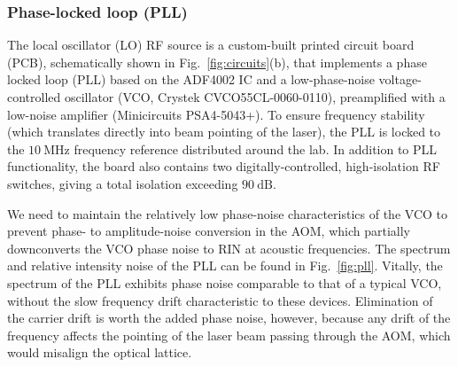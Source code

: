 \documentclass[twocolumn,aps,pra,showpacs,preprintnumbers,bibnotes]{revtex4-1}
\newcommand\unit[2]{\ensuremath{#1~\mathrm{{#2}}}}
\begin{document}
\subsubsection{Phase-locked loop (PLL)}
The local oscillator (LO) RF source is a custom-built printed circuit board (PCB), schematically shown in Fig.~\ref{fig:circuits}(b), that implements a phase locked loop (PLL) based on the ADF4002 IC and a low-phase-noise voltage-controlled oscillator (VCO, Crystek CVCO55CL-0060-0110), preamplified with a low-noise amplifier (Minicircuits PSA4-5043+).
To ensure frequency stability (which translates directly into beam pointing of the laser), the PLL is locked to the \unit{10}{MHz} frequency reference distributed around the lab.
In addition to PLL functionality, the board also contains two digitally-controlled, high-isolation RF switches, giving a total isolation exceeding \unit{90}{dB}.

We need to maintain the relatively low phase-noise characteristics of the VCO to prevent phase- to amplitude-noise conversion in the AOM, which partially downconverts the VCO phase noise to RIN at acoustic frequencies.
The spectrum and relative intensity noise of the PLL can be found in Fig.~\ref{fig:pll}.
Vitally, the spectrum of the PLL exhibits phase noise comparable to that of a typical VCO, without the slow frequency drift characteristic to these devices.
Elimination of the carrier drift is worth the added phase noise, however, because any drift of the frequency affects the pointing of the laser beam passing through the AOM, which would misalign the optical lattice.
\end{document}
